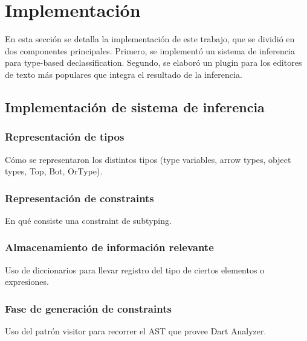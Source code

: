 \chapter{Implementación}
En esta sección se detalla la implementación de este trabajo, que se dividió en dos componentes principales. Primero, se implementó un sistema de inferencia para type-based declassification. Segundo, se elaboró un plugin para los editores de texto más populares que integra el resultado de la inferencia.

\section{Implementación de sistema de inferencia}

\subsection{Representación de tipos}
Cómo se representaron los distintos tipos (type variables, arrow types, object types, Top, Bot, OrType).

\subsection{Representación de constraints}
En qué consiste una constraint de subtyping.

\subsection{Almacenamiento de información relevante}
Uso de diccionarios para llevar registro del tipo de ciertos elementos o expresiones.

\subsection{Fase de generación de constraints}
Uso del patrón visitor para recorrer el AST que provee Dart Analyzer.
